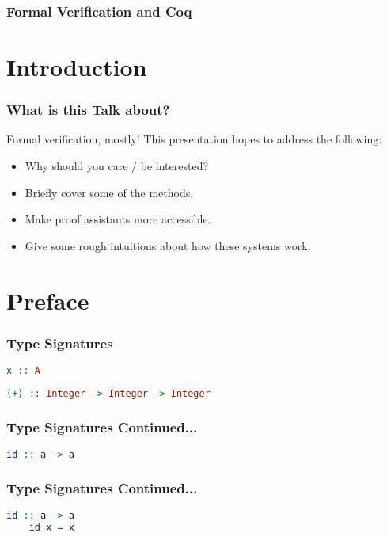 \documentclass{beamer}
\author{
  Beck, Calvin\\
  \href{mailto:hobbes@ualberta.ca}{hobbes@ualberta.ca}
}
\begin{document}
\begin{frame}
  \frametitle{Formal Verification and Coq}
  \maketitle
\end{frame}

\section{Introduction}

\begin{frame}
  \frametitle{What is this Talk about?}

  Formal verification, mostly! This presentation hopes to address the following:

  \begin{itemize}
  \item Why should you care / be interested?
  \item Briefly cover some of the methods.
  \item Make proof assistants more accessible.
  \item Give some rough intuitions about how these systems work.
  \end{itemize}
\end{frame}


\section{Preface}

\begin{frame}[fragile]
  \frametitle{Type Signatures}

    \begin{lstlisting}[frame=single, language=Haskell, breaklines=true]
      x :: A
    \end{lstlisting}

    \begin{lstlisting}[frame=single, language=Haskell, breaklines=true]
      (+) :: Integer -> Integer -> Integer
    \end{lstlisting}
\end{frame}

\begin{frame}[fragile]
  \frametitle{Type Signatures Continued...}

  \begin{lstlisting}[frame=single, language=Haskell, breaklines=true]
    id :: a -> a
  \end{lstlisting}
\end{frame}


\begin{frame}[fragile]
  \frametitle{Type Signatures Continued...}

  \begin{lstlisting}[frame=single, language=Haskell, breaklines=true]
    id :: a -> a
    id x = x
  \end{lstlisting}
\end{frame}
\end{document}

